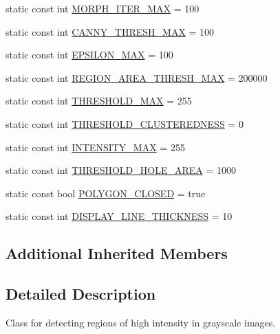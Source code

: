 \begin{DoxyCompactItemize}
static const int \hyperlink{classmultiscale_1_1analysis_1_1RegionDetector_adeaa40a86b09bad2530bf179cbb4e602}{M\-O\-R\-P\-H\-\_\-\-I\-T\-E\-R\-\_\-\-M\-A\-X} = 100
\item 
static const int \hyperlink{classmultiscale_1_1analysis_1_1RegionDetector_ad6590f4617a6b3d34c6032f8febd7beb}{C\-A\-N\-N\-Y\-\_\-\-T\-H\-R\-E\-S\-H\-\_\-\-M\-A\-X} = 100
\item 
static const int \hyperlink{classmultiscale_1_1analysis_1_1RegionDetector_a724d57c0db65696f2ddab415deb1138d}{E\-P\-S\-I\-L\-O\-N\-\_\-\-M\-A\-X} = 100
\item 
static const int \hyperlink{classmultiscale_1_1analysis_1_1RegionDetector_a8a301bd841d376448aff4a0c4d0a1485}{R\-E\-G\-I\-O\-N\-\_\-\-A\-R\-E\-A\-\_\-\-T\-H\-R\-E\-S\-H\-\_\-\-M\-A\-X} = 200000
\item 
static const int \hyperlink{classmultiscale_1_1analysis_1_1RegionDetector_a53c6e2b067a8b8c82484cbca34cc3d57}{T\-H\-R\-E\-S\-H\-O\-L\-D\-\_\-\-M\-A\-X} = 255
\item 
static const int \hyperlink{classmultiscale_1_1analysis_1_1RegionDetector_a52778f49510e1e500b2dc48857724e20}{T\-H\-R\-E\-S\-H\-O\-L\-D\-\_\-\-C\-L\-U\-S\-T\-E\-R\-E\-D\-N\-E\-S\-S} = 0
\item 
static const int \hyperlink{classmultiscale_1_1analysis_1_1RegionDetector_a3b682d43cd686a8bdfce91b0cbbf5245}{I\-N\-T\-E\-N\-S\-I\-T\-Y\-\_\-\-M\-A\-X} = 255
\item 
static const int \hyperlink{classmultiscale_1_1analysis_1_1RegionDetector_a13c551ec0b08e03f69efd0f8d7b08626}{T\-H\-R\-E\-S\-H\-O\-L\-D\-\_\-\-H\-O\-L\-E\-\_\-\-A\-R\-E\-A} = 1000
\item 
static const bool \hyperlink{classmultiscale_1_1analysis_1_1RegionDetector_a1b3de2646beaac60d03527f1775614be}{P\-O\-L\-Y\-G\-O\-N\-\_\-\-C\-L\-O\-S\-E\-D} = true
\item 
static const int \hyperlink{classmultiscale_1_1analysis_1_1RegionDetector_aee6fbc641e8a6a85b1d877f9b4c6c6c3}{D\-I\-S\-P\-L\-A\-Y\-\_\-\-L\-I\-N\-E\-\_\-\-T\-H\-I\-C\-K\-N\-E\-S\-S} = 10
\end{DoxyCompactItemize}
\subsection*{Additional Inherited Members}


\subsection{Detailed Description}
Class for detecting regions of high intensity in grayscale images. 

